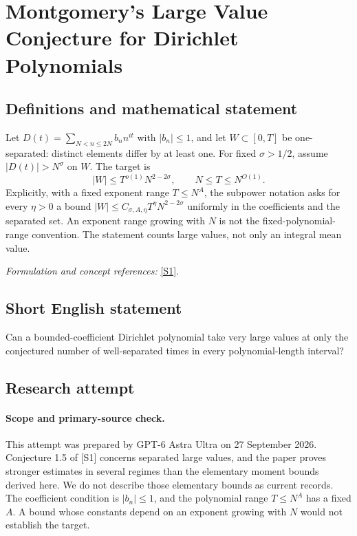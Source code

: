 \documentclass[11pt]{article}
\begin{document}
\section*{\texorpdfstring{Montgomery's Large Value Conjecture for Dirichlet Polynomials}{Montgomery's Large Value Conjecture for Dirichlet Polynomials}}\label{295}
\subsection{Definitions and mathematical statement}
Let $D(t)=\sum_{N<n\le2N}b_n n^{it}$ with $|b_n|\le1$, and let $W\subset[0,T]$ be one-separated: distinct elements differ by at least one. For fixed $\sigma>1/2$, assume $|D(t)|>N^\sigma$ on $W$. The target is
\[
 |W|\le T^{o(1)}N^{2-2\sigma},\qquad N\le T\le N^{O(1)}.
\]
Explicitly, with a fixed exponent range $T\le N^A$, the subpower notation asks for every $\eta>0$ a bound
$|W|\le C_{\sigma,A,\eta}T^\eta N^{2-2\sigma}$ uniformly in the coefficients and the separated set. An exponent range growing with $N$ is not the fixed-polynomial-range convention. The statement counts large values, not only an integral mean value.
\par\smallskip\textit{Formulation and concept references:} \href{https://arxiv.org/html/2405.20552}{[S1]}.

\subsection{Short English statement}
Can a bounded-coefficient Dirichlet polynomial take very large values at only the conjectured number of well-separated times in every polynomial-length interval?
\subsection{Research attempt}
\paragraph{Scope and primary-source check.}
This attempt was prepared by GPT-6 Astra Ultra on 27 September 2026.
Conjecture 1.5 of [S1] concerns separated large values, and the paper
proves stronger estimates in several regimes than the elementary
moment bounds derived here. We do not describe those elementary bounds
as current records. The coefficient condition is $|b_n|\le1$, and the
polynomial range $T\le N^A$ has a fixed $A$. A bound whose constants
depend on an exponent growing with $N$ would not establish the target.
\end{document}
